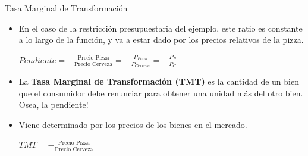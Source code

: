 \documentclass{beamer}
\begin{document}
\begin{frame}{Tasa Marginal de Transformación}
    \begin{itemize}
        \item En el caso de la restricción presupuestaria del ejemplo, este ratio es constante a lo largo de la función, y va a estar dado por los precios relativos de la pizza. \\ \vspace{2mm}
         \begin{center}
        $Pendiente = - \frac{\text{Precio Pizza}}{\text{Precio Cerveza}}= -\frac{P_{Pizza}}{P_{Cerveza}}=-\frac{P_P}{P_C}$
        \end{center}
       \vspace{2mm}
        \item La \textbf{Tasa Marginal de Transformación (TMT)} es la cantidad de un bien que el consumidor debe renunciar para obtener una unidad más del otro bien. Osea, la pendiente!
        \item Viene determinado por los precios de los bienes en el mercado.\\ \vspace{6mm} 
        \begin{center}
          $TMT = - \frac{\text{Precio Pizza}}{\text{Precio Cerveza}}$
          \end{center}
    \end{itemize} 
\end{frame}
    
\end{document}
